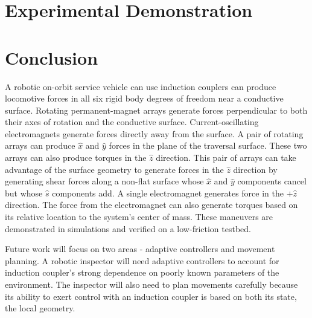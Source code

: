 \documentclass[letterpaper, 10 pt, conference]{ieeeconf}  %
\begin{document}
\section{Experimental Demonstration}\label{sec:experiments}
\section{Conclusion}
A robotic on-orbit service vehicle can use induction couplers can produce locomotive forces in all six rigid body degrees of freedom near a conductive surface. Rotating permanent-magnet arrays generate forces perpendicular to both their axes of rotation and the conductive surface. Current-oscillating electromagnets generate forces directly away from the surface. A pair of rotating arrays can produce $\hat{x}$ and $\hat{y}$ forces in the plane of the traversal surface. These two arrays can also produce torques in the $\hat{z}$ direction. This pair of arrays can take advantage of the surface geometry to generate forces in the $\hat{z}$ direction by generating shear forces along a non-flat surface whose $\hat{x}$ and $\hat{y}$ components cancel but whose $\hat{s}$ components add. A single electromagnet generates force in the $+\hat{z}$ direction. The force from the electromagnet can also generate torques based on its relative location to the system's center of mass. These maneuvers are demonstrated in simulations and verified on a low-friction testbed.  

Future work will focus on two areas - adaptive controllers and movement planning. A robotic inspector will need adaptive controllers to account for induction coupler's strong dependence on poorly known parameters of the environment.  The inspector will also need to plan movements carefully because its ability to exert control with an induction coupler is based on both its state, the local geometry.      
\end{document}
